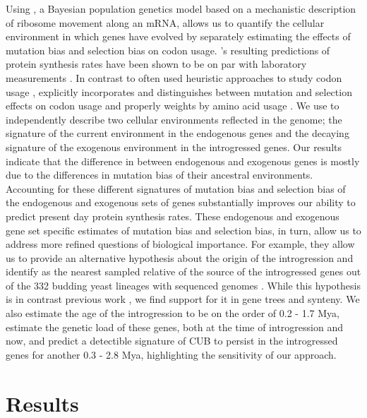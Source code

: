 \documentclass[fleqn,letterpaper]{article}
\begin{document}
Using \ROC, a Bayesian population genetics model based on a mechanistic description of ribosome movement along an mRNA, allows us to quantify the cellular environment in which genes have evolved by separately estimating the effects of mutation bias and selection bias on codon usage.
\ROC's resulting predictions of protein synthesis rates have been shown to be on par with laboratory measurements \citep{ShahAndGilchrist2011, gilchrist2015}.
In contrast to often used heuristic approaches to study codon usage \citep{sharp1987, Wright1990, dosreis2004}, \ROC explicitly incorporates and distinguishes between mutation and selection effects on codon usage and properly weights by amino acid usage \citep{cope2018}.
We use \ROC to independently describe two cellular environments reflected in the \kluyveri genome; the signature of the current environment in the endogenous genes and the decaying signature of the exogenous environment in the introgressed genes.
Our results indicate that the difference in \GC between endogenous and exogenous genes is mostly due to the differences in mutation bias of their ancestral environments.
Accounting for these different signatures of mutation bias and selection bias of the endogenous and exogenous sets of genes substantially improves our ability to predict present day protein synthesis rates.
These endogenous and exogenous gene set specific estimates of mutation bias and selection bias, in turn, allow us to address more refined questions of biological importance.
For example, they allow us to provide an alternative hypothesis about the origin of the introgression and identify \gossypii as the nearest sampled relative of the source of the introgressed genes out of the 332 budding yeast lineages with sequenced genomes \citep{shen2018}.
While this hypothesis is in contrast previous work \citep{payen2009, friedrich2015, vakirlis2016, brion2017}, we find support for it in gene trees and synteny.
We also estimate the age of the introgression to be on the order of 0.2 - 1.7 Mya, estimate the genetic load of these genes, both at the time of introgression and now, and predict a detectible signature of CUB to persist in the introgressed genes for another 0.3 - 2.8 Mya, highlighting the sensitivity of our approach.

\section*{Results}
\end{document}
